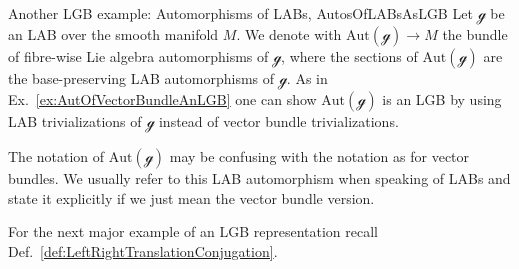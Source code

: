 \documentclass[a4paper,oneside,11pt,bibliography=totoc]{scrartcl}
\theoremstyle{plain}
\theoremstyle{remark}
\theoremstyle{definition}
\begin{document}
\begin{examples}{Another LGB example: Automorphisms of LABs, \newline \cite[\S 1.7, special situation of Ex.\ 1.7.12, page 46]{mackenzieGeneralTheory}}{AutosOfLABsAsLGB}
Let $\mathcal{g}$ be an LAB over the smooth manifold $M$. We denote with $\mathrm{Aut}(\mathcal{g}) \to M$ the bundle of fibre-wise Lie algebra automorphisms of $\mathcal{g}$, where the sections of $\mathrm{Aut}(\mathcal{g})$ are the base-preserving LAB automorphisms of $\mathcal{g}$. As in Ex.\ \ref{ex:AutOfVectorBundleAnLGB} one can show $\mathrm{Aut}(\mathcal{g})$ is an LGB by using LAB trivializations of $\mathcal{g}$ instead of vector bundle trivializations.

The notation of $\mathrm{Aut}(\mathcal{g})$ may be confusing with the notation as for vector bundles. We usually refer to this LAB automorphism when speaking of LABs and state it explicitly if we just mean the vector bundle version.
\end{examples}

For the next major example of an LGB representation recall Def.\ \ref{def:LeftRightTranslationConjugation}.
\end{document}
